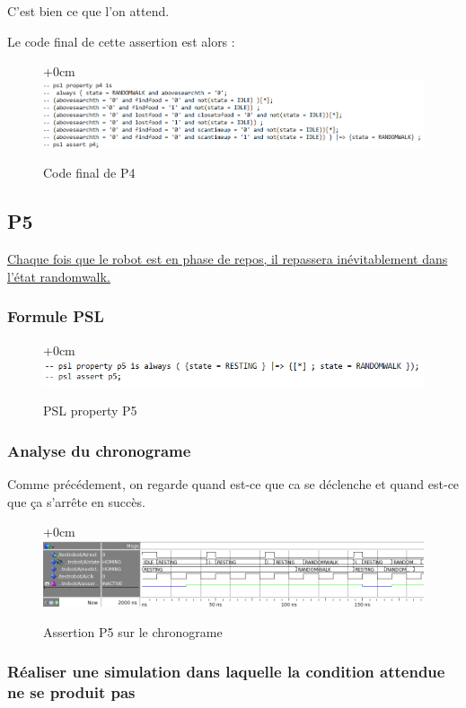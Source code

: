 \documentclass{article}
\newcommand{\sautligne}{
\textbf{\vspace{5mm}}
}
\begin{document}
C'est bien ce que l'on attend.
\sautligne

Le code final de cette assertion est alors : 

 \begin{figure}[!h]
\advance\leftskip+0cm
\includegraphics[scale=0.6]{PSL/P4-5.PNG}
\caption{Code final de P4 }
\end{figure}



\subsection{P5}
\uline{Chaque fois que le robot est en phase de repos, il repassera inévitablement dans l'état
randomwalk.}
\subsubsection{Formule PSL }
\begin{figure}[!h]
\advance\leftskip+0cm
\includegraphics[scale=0.7]{PSL/P5.PNG}
\caption{PSL property P5}
\end{figure}

\newpage
\subsubsection{Analyse du chronograme}

Comme précédement, on regarde quand est-ce que ca se déclenche et quand est-ce que ça s'arrête en succès.

\begin{figure}[!h]
\advance\leftskip+0cm
\includegraphics[scale=0.6]{PSL/P5-1.PNG}
\caption{Assertion P5 sur le chronograme }
\end{figure}

\subsubsection{ Réaliser une simulation
dans laquelle la condition attendue ne se produit pas}
\end{document}
